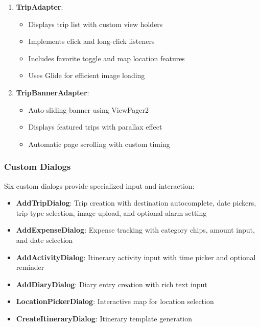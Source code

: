 \documentclass[12pt,a4paper]{article}
\begin{document}
\begin{enumerate}
    \item \textbf{TripAdapter}:
    \begin{itemize}
        \item Displays trip list with custom view holders
        \item Implements click and long-click listeners
        \item Includes favorite toggle and map location features
        \item Uses Glide for efficient image loading
    \end{itemize}

    \item \textbf{TripBannerAdapter}:
    \begin{itemize}
        \item Auto-sliding banner using ViewPager2
        \item Displays featured trips with parallax effect
        \item Automatic page scrolling with custom timing
    \end{itemize}
\end{enumerate}

\subsubsection{Custom Dialogs}
Six custom dialogs provide specialized input and interaction:

\begin{itemize}
    \item \textbf{AddTripDialog}: Trip creation with destination autocomplete, date pickers, trip type selection, image upload, and optional alarm setting
    \item \textbf{AddExpenseDialog}: Expense tracking with category chips, amount input, and date selection
    \item \textbf{AddActivityDialog}: Itinerary activity input with time picker and optional reminder
    \item \textbf{AddDiaryDialog}: Diary entry creation with rich text input
    \item \textbf{LocationPickerDialog}: Interactive map for location selection
    \item \textbf{CreateItineraryDialog}: Itinerary template generation
\end{itemize}
\end{document}
